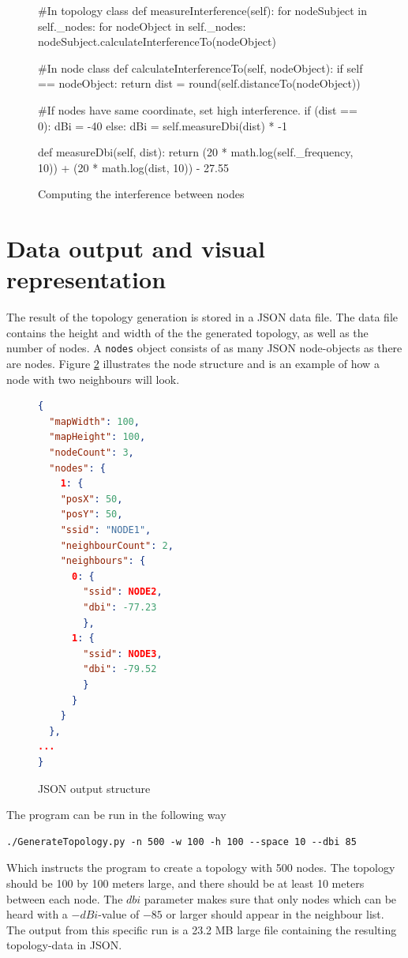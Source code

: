 	\begin{figure}[H]
		\begin{python}
#In topology class
def measureInterference(self):
 for nodeSubject in self._nodes:  
  for nodeObject in self._nodes:
    nodeSubject.calculateInterferenceTo(nodeObject) 

#In node class
def calculateInterferenceTo(self, nodeObject):
 if self == nodeObject:
  return
 dist = round(self.distanceTo(nodeObject))

#If  nodes have same coordinate, set high interference. 
 if (dist == 0):
  dBi = -40
 else:
  dBi  = self.measureDbi(dist) * -1

def measureDbi(self, dist):
 return (20 * math.log(self._frequency, 10)) + 
(20 * math.log(dist, 10)) - 27.55

			\end{python}
			\caption{Computing the interference between nodes}
			\label{fig:dbiCreation}
			\end{figure}

			\section{Data output and visual representation} \label{simulationrep}
			The result of the topology generation is stored in a JSON\cite{JSON} data file. The data file contains the height and width of the the generated topology, as well
			as the number of nodes. A \verb|nodes| object consists of as many JSON node-objects as there are nodes. Figure \ref{fig:nodeStruct} illustrates the node structure
			and is an example of how a node with two neighbours will look.
			\begin{figure}[H]
			\begin{minipage}{\linewidth}
			\begin{lstlisting}[language=json]
{
  "mapWidth": 100,
  "mapHeight": 100,
  "nodeCount": 3,
  "nodes": {
    1: {
    "posX": 50,
    "posY": 50, 
    "ssid": "NODE1", 
    "neighbourCount": 2, 
    "neighbours": {
      0: {
        "ssid": NODE2,
        "dbi": -77.23
        },
      1: {
        "ssid": NODE3,
        "dbi": -79.52
        }
      }
    }
  },
...
}
\end{lstlisting}
\end{minipage}
\caption{JSON output structure}
\label{fig:nodeStruct}

\end{figure}
The program can be run in the following way
\begin{verbatim}./GenerateTopology.py -n 500 -w 100 -h 100 --space 10 --dbi 85 \end{verbatim}
Which instructs the program to create a topology with 500 nodes. The topology should be 100 by 100 meters large, and there should be at least 10 meters
between each node. The $dbi$ parameter makes sure that only nodes which can be heard with a $-dBi$-value of $-85$ or larger should appear in the neighbour list. 
The output from this specific run is a 23.2 MB large file containing the resulting topology-data in JSON.

